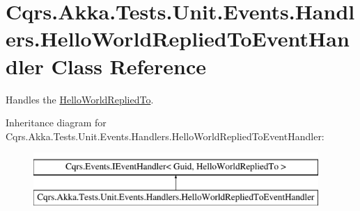 \hypertarget{classCqrs_1_1Akka_1_1Tests_1_1Unit_1_1Events_1_1Handlers_1_1HelloWorldRepliedToEventHandler}{}\section{Cqrs.\+Akka.\+Tests.\+Unit.\+Events.\+Handlers.\+Hello\+World\+Replied\+To\+Event\+Handler Class Reference}
\label{classCqrs_1_1Akka_1_1Tests_1_1Unit_1_1Events_1_1Handlers_1_1HelloWorldRepliedToEventHandler}


Handles the \hyperlink{classCqrs_1_1Akka_1_1Tests_1_1Unit_1_1Events_1_1HelloWorldRepliedTo}{Hello\+World\+Replied\+To}.  


Inheritance diagram for Cqrs.\+Akka.\+Tests.\+Unit.\+Events.\+Handlers.\+Hello\+World\+Replied\+To\+Event\+Handler\+:\begin{figure}[H]
\begin{center}
\leavevmode
\includegraphics[height=2.000000cm]{classCqrs_1_1Akka_1_1Tests_1_1Unit_1_1Events_1_1Handlers_1_1HelloWorldRepliedToEventHandler}
\end{center}
\end{figure}
